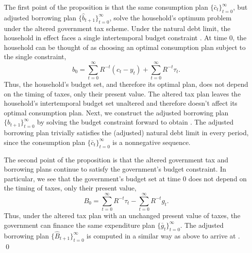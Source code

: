  The first point of the proposition
is that the same consumption plan $\{\bar c_t\}_{t=0}^\infty$, but adjusted
borrowing plan $\{\hat b_{t+1}\}_{t=0}^\infty$, solve the household's optimum
problem under the altered government tax scheme.
    Under the natural debt limit,
the household in effect faces  a single intertemporal
budget constraint . At time $0$, the household can be
thought of as choosing an optimal consumption plan subject to
the single constraint,
$$ b_0 = \sum_{t=0}^\infty R^{-t} (c_{t} - y_{t})
        +  \sum_{t=0}^\infty R^{-t} \tau_{t}.$$
Thus, the household's budget set, and therefore its optimal  plan,
does not depend
on the timing of taxes, only their present value.   The altered
tax plan leaves the household's   intertemporal   budget set unaltered
and therefore doesn't affect its optimal consumption plan. Next,
we construct the adjusted borrowing plan
$\{\hat b_{t+1}\}_{t=0}^\infty$ by solving the budget constraint 
forward to obtain .
The adjusted borrowing plan trivially
satisfies  the (adjusted) natural debt limit in every period,
since the consumption
plan $\{\bar c_t\}_{t=0}^\infty$ is a nonnegative sequence.

The second point of the proposition is that the altered government tax
and borrowing plans continue to satisfy the government's budget constraint.
In particular, we see that the government's budget set at time $0$ does
not depend on the timing of taxes, only their present value,
$$
B_0  = \sum_{t=0}^\infty R^{-t} \tau_t - \sum_{t=0}^\infty R^{-t} g_{t}.
$$
Thus, under the altered tax plan with an unchanged present value of taxes,
the government can finance the same expenditure plan $\{\bar g_t\}_{t=0}^\infty$.
The adjusted borrowing plan $\{\hat B_{t+1}\}_{t=0}^\infty$ is computed
in a similar way as above to arrive at . \qed

